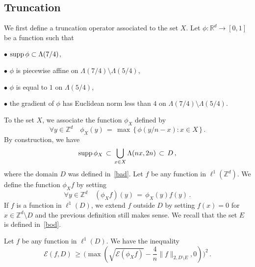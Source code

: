 \documentclass[AHL, Unicode, longabstracts, published]{cedram}
\newcommand*\supp{\text{supp\,}}
\newcommand*\Zd {{\mathbb Z^d}}
\newcommand*\Rd {{\mathbb R^d}}
\newcommand*\La {{\Lambda}}
\newcommand{\cE}{\mathcal{E}}
\let\oldforall\forall
\renewcommand*{\forall}{\mathrel{\oldforall}}
\begin{document}
\subsection{Truncation}\label{trun}
We first define a truncation operator associated to the set $X$. Let $\phi:\Rd\to [0,1]$ be a function such that

\noindent $\bullet$ $\supp\phi\subset\La(7/4)$,

\noindent $\bullet$ $\phi$ is piecewise affine on $\La(7/4)\setminus\La(5/4)$,

\noindent $\bullet$ $\phi$ is equal to $1$ on $\La(5/4)$,

\noindent $\bullet$ the gradient of $\phi$ has Euclidean norm less than $4$ on $\La(7/4)\setminus\La(5/4)$.

\noindent To the set $X$, we associate the function $\phi_X$ defined by
\[
\forall y\in\Zd\quad \phi_X(y)\,=\,\max\,\big\{\,
\phi(y/n-x): {x\in X}\,\big\}
\,.
\]
By construction, we have
\begin{equation}\label{seein}
\supp\phi_X\,\subset\,
\bigcup_{x\in X}\Lambda(nx,2n)\,\subset\, D\,,
\end{equation}
where the domain $D$ was defined in~\eqref{bad}. Let $f$ be any function in $\ell^1(\Zd)$. We define the function $\phi_Xf$ by setting
\[
\forall y\in\Zd
\quad (\phi_Xf)(y)\,=\,\phi_X(y) f(y)\,.
\]
If $f$ is a function in $\ell^1(D)$, we extend $f$ outside $D$ by setting $f(x)=0$ for $x\in\Zd\setminus D$ and the previous definition still makes sense. We recall that the set $E$ is defined in~\eqref{bod}.
\begin{prop}\label{depa}
Let $f$ be any function in $\ell^1(D)$. We have the inequality
\[
\cE(f,D)\,\geq\,\Bigg(
\max\left(\sqrt{\cE(\phi_Xf)}-
\frac{4}{n}
\|f\|_{2,D\setminus E},0\right)\Bigg)^2\,.
\]
\end{prop}
\end{document}
